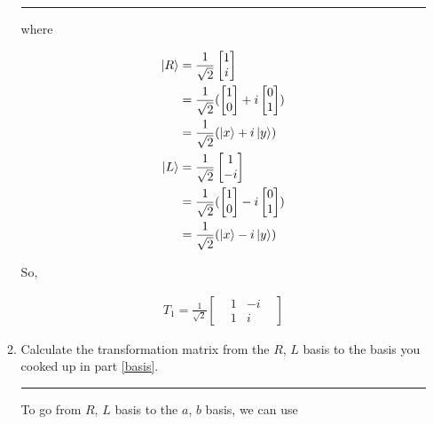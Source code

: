 \documentclass[12pt, oneside]{article}
\newenvironment{answer}
  {\vspace*{0.2cm} \rule{12cm}{0.02cm} \vspace*{0.2cm}}
  {\vspace*{0.2cm}}
\begin{document}
\begin{enumerate}
\begin{enumerate}
\begin{answer}
      where

      \begin{align*}
        \ket{R} &= \frac{1}{\sqrt{2}}\begin{bmatrix}1 \\  i\end{bmatrix} \\
                &= \frac{1}{\sqrt{2}}(\begin{bmatrix}1 \\  0\end{bmatrix} + i \begin{bmatrix}0 \\  1\end{bmatrix})\\
                &= \frac{1}{\sqrt{2}}(\ket{x} + i\ket{y})\\
        \ket{L} &= \frac{1}{\sqrt{2}}\begin{bmatrix}1 \\  -i\end{bmatrix} \\
                &= \frac{1}{\sqrt{2}}(\begin{bmatrix}1 \\  0\end{bmatrix} - i \begin{bmatrix}0 \\  1\end{bmatrix})\\
                &= \frac{1}{\sqrt{2}}(\ket{x} - i\ket{y})\\
      \end{align*}

      So,

      \begin{align*}
        T_1 = \frac{1}{\sqrt{2}}\begin{bmatrix}
                                  &1 &-i &\\
                                  &1 &i &
                                \end{bmatrix}
      \end{align*}
    \end{answer}

    \item Calculate the transformation matrix from the $R$, $L$ basis to the basis you cooked up in part \ref{basis}. \label{transformation2}

    \begin{answer}
      To go from $R$, $L$ basis to the $a$, $b$ basis, we can use


\end{answer}
\end{enumerate}
\end{enumerate}
\end{document}

